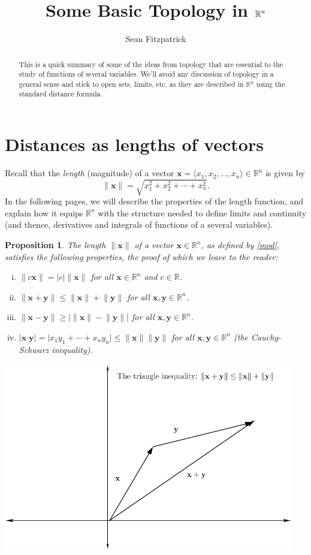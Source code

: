 \documentclass[12pt,letterpaper]{article}
\author{Sean Fitzpatrick}
\title{Some Basic Topology in $\R^n$}
\newtheorem{proposition}[theorem]{Proposition}
\newcommand{\R}{\mathbb{R}}
\newcommand{\abs}[1]{\lvert#1\rvert}
\newcommand{\len}[1]{\lVert#1\rVert}
\newcommand{\x}{\mathbf{x}}
\newcommand{\y}{\mathbf{y}}
\newcommand{\dotp}{\boldsymbol{\cdot}}
\begin{document}
\maketitle
\begin{abstract}
This is a quick summary of some of the ideas from topology that are essential to the study of functions of several variables. We'll avoid any discussion of topology in a general sense and stick to open sets, limits, etc. as they are described in $\R^n$ using the standard distance formula.
\end{abstract}
\section{Distances as lengths of vectors}
Recall that the {\em length} (magnitude) of a vector $\x = \langle x_1, x_2, \ldots,x_n\rangle \in\R^n$ is given by
\begin{equation}\label{mod}
\lVert\x\rVert = \sqrt{x_1^2+x_2^2+\cdots+ x_n^2}.
\end{equation}
In the following pages, we will describe the properties of the length function, and explain how it equips $\R^n$ with the structure needed to define limits and continuity (and thence, derivatives and integrals of functions of a several variables).  
\begin{proposition}\label{prop1}
The length $\lVert\x\rVert$ of a vector $\x\in\R^n$, as defined by \eqref{mod}, satisfies the following properties, the proof of which we leave to the reader:
\begin{enumerate}[(i)]
\item $\len{c\x} = \abs{c}\len{\x}$ for all $\x\in\R^n$ and $c\in\R$.
\item $\len{\x+\y} \leq \len{\x}+\len{\y}$ for all $\x,\y\in\R^n$.
\item $\len{\x-\y} \geq \left|\len{\x}-\len{\y}\right|$ for all $\x,\y\in \R^n$.
\item $\abs{\x\dotp\y} = \abs{x_1y_1+\cdots + x_ny_n}\leq \len{\x}\len{\y}$ for all $\x,\y\in\R^n$ (the Cauchy-Schwarz inequality).
\end{enumerate}
\end{proposition}
\begin{center}
\includegraphics[width=5in]{triangle.pdf}
\end{center}
\end{document}
